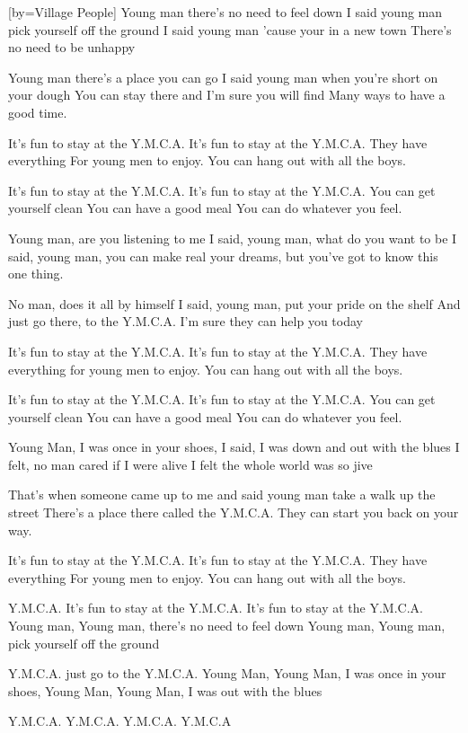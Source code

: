 [by={Village People}]
\beginverse
Young man there's no need to feel down
I said young man pick yourself off the ground
I said young man 'cause your in a new town
There's no need to be unhappy
\endverse

\beginverse
Young man there's a place you can go
I said young man when you're short on your dough
You can stay there and I'm sure you will find
Many ways to have a good time.
\endverse

\beginchorus
It's fun to stay at the Y.M.C.A.
It's fun to stay at the Y.M.C.A.
They have everything For young men to enjoy.
You can hang out with all the boys.
\endchorus

\beginchorus
It's fun to stay at the Y.M.C.A.
It's fun to stay at the Y.M.C.A.
You can get yourself clean
You can have a good meal
You can do whatever you feel.
\endchorus

\beginverse
Young man, are you listening to me
I said, young man, what do you want to be
I said, young man, you can make real your dreams,
but you've got to know this one thing.
\endverse

\beginverse
No man, does it all by himself
I said, young man, put your pride on the shelf
And just go there, to the Y.M.C.A.
I'm sure they can help you today
\endverse

\beginchorus
It's fun to stay at the Y.M.C.A.
It's fun to stay at the Y.M.C.A.
They have everything for young men to enjoy.
You can hang out with all the boys.
\endchorus

\beginchorus
It's fun to stay at the Y.M.C.A.
It's fun to stay at the Y.M.C.A.
You can get yourself clean
You can have a good meal
You can do whatever you feel.
\endchorus

\beginverse
Young Man, I was once in your shoes,
I said, I was down and out with the blues
I felt, no man cared if I were alive
I felt the whole world was so jive
\endverse

\beginverse
That's when someone came up to me
and said young man take a walk up the street
There's a place there called the Y.M.C.A.
They can start you back on your way.
\endverse

\beginchorus
It's fun to stay at the Y.M.C.A.
It's fun to stay at the Y.M.C.A.
They have everything For young men to enjoy.
You can hang out with all the boys.
\endchorus

\beginchorus
Y.M.C.A.
It's fun to stay at the Y.M.C.A.
It's fun to stay at the Y.M.C.A.
Young man, Young man, there's no need to feel down
Young man, Young man, pick yourself off the ground
\endchorus

\beginchorus
Y.M.C.A.
just go to the Y.M.C.A.
Young Man, Young Man, I was once in your shoes,
Young Man, Young Man, I was out with the blues
\endchorus

\beginchorus
Y.M.C.A.
Y.M.C.A.
Y.M.C.A.
Y.M.C.A 
\endchorus
\endsong